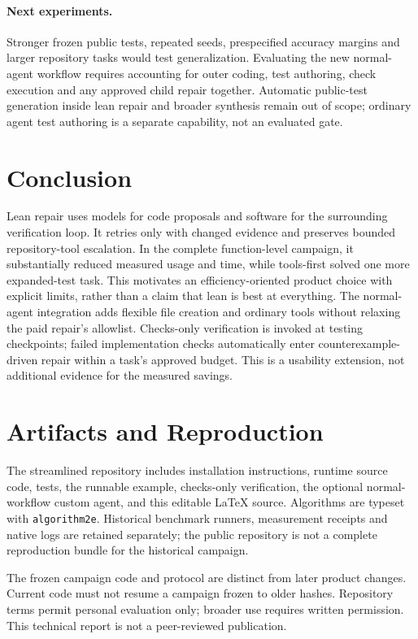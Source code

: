 \documentclass[10pt,twocolumn,a4paper]{article}
\begin{document}
\paragraph{Next experiments.}
Stronger frozen public tests, repeated seeds, prespecified accuracy margins
and larger repository tasks would test generalization. Evaluating the new
normal-agent workflow requires accounting for outer coding, test authoring,
check execution and any approved child repair together. Automatic public-test
generation inside lean repair and broader synthesis remain out of scope;
ordinary agent test authoring is a separate capability, not an evaluated gate.

\section{Conclusion}
Lean repair uses models for code proposals and software for the surrounding
verification loop. It retries only with changed evidence and preserves
bounded repository-tool escalation. In the complete function-level campaign,
it substantially reduced measured usage and time, while tools-first solved
one more expanded-test task. This motivates an efficiency-oriented product
choice with explicit limits, rather than a claim that lean is best at
everything.
The normal-agent integration adds flexible file creation and ordinary tools
without relaxing the paid repair's allowlist. Checks-only verification is
invoked at testing checkpoints; failed implementation checks automatically
enter counterexample-driven repair within a task's approved budget.
This is a usability extension, not additional evidence for the measured savings.

\section*{Artifacts and Reproduction}
The streamlined repository includes installation instructions, runtime source
code, tests, the runnable example, checks-only verification, the optional
normal-workflow custom agent, and this editable \LaTeX{} source.
Algorithms are typeset with \texttt{algorithm2e}. Historical benchmark runners,
measurement receipts and native logs are retained separately; the public
repository is not a complete reproduction bundle for the historical campaign.

The frozen campaign code and protocol are distinct from later product
changes. Current code must not resume a campaign frozen to older hashes.
Repository terms permit personal evaluation only; broader use requires
written permission. This technical report is not a peer-reviewed publication.
\end{document}
